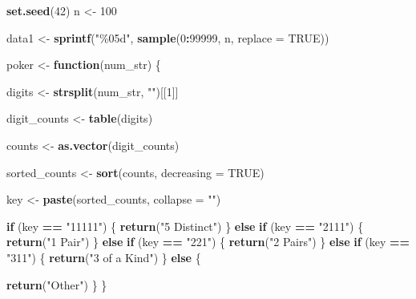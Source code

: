 \documentclass[
  persian,
]{article}
\newenvironment{Shaded}{\begin{snugshade}}{\end{snugshade}}
\newcommand{\AttributeTok}[1]{\textcolor[rgb]{0.13,0.29,0.53}{#1}}
\newcommand{\ConstantTok}[1]{\textcolor[rgb]{0.56,0.35,0.01}{#1}}
\newcommand{\ControlFlowTok}[1]{\textcolor[rgb]{0.13,0.29,0.53}{\textbf{#1}}}
\newcommand{\DecValTok}[1]{\textcolor[rgb]{0.00,0.00,0.81}{#1}}
\newcommand{\FunctionTok}[1]{\textcolor[rgb]{0.13,0.29,0.53}{\textbf{#1}}}
\newcommand{\NormalTok}[1]{#1}
\newcommand{\OtherTok}[1]{\textcolor[rgb]{0.56,0.35,0.01}{#1}}
\newcommand{\SpecialCharTok}[1]{\textcolor[rgb]{0.81,0.36,0.00}{\textbf{#1}}}
\newcommand{\StringTok}[1]{\textcolor[rgb]{0.31,0.60,0.02}{#1}}
\begin{document}
\begin{Shaded}
\begin{Highlighting}[]
\FunctionTok{set.seed}\NormalTok{(}\DecValTok{42}\NormalTok{)}
\NormalTok{n }\OtherTok{\textless{}{-}} \DecValTok{100}

\NormalTok{data1 }\OtherTok{\textless{}{-}} \FunctionTok{sprintf}\NormalTok{(}\StringTok{"\%05d"}\NormalTok{, }\FunctionTok{sample}\NormalTok{(}\DecValTok{0}\SpecialCharTok{:}\DecValTok{99999}\NormalTok{, n, }\AttributeTok{replace =} \ConstantTok{TRUE}\NormalTok{))}

\NormalTok{poker }\OtherTok{\textless{}{-}} \ControlFlowTok{function}\NormalTok{(num\_str) \{}
  
\NormalTok{  digits }\OtherTok{\textless{}{-}} \FunctionTok{strsplit}\NormalTok{(num\_str, }\StringTok{""}\NormalTok{)[[}\DecValTok{1}\NormalTok{]]}
  
\NormalTok{  digit\_counts }\OtherTok{\textless{}{-}} \FunctionTok{table}\NormalTok{(digits)}
  
\NormalTok{  counts }\OtherTok{\textless{}{-}} \FunctionTok{as.vector}\NormalTok{(digit\_counts)}
  
\NormalTok{  sorted\_counts }\OtherTok{\textless{}{-}} \FunctionTok{sort}\NormalTok{(counts, }\AttributeTok{decreasing =} \ConstantTok{TRUE}\NormalTok{)}
  
\NormalTok{  key }\OtherTok{\textless{}{-}} \FunctionTok{paste}\NormalTok{(sorted\_counts, }\AttributeTok{collapse =} \StringTok{""}\NormalTok{)}
  
  \ControlFlowTok{if}\NormalTok{ (key }\SpecialCharTok{==} \StringTok{"11111"}\NormalTok{) \{}
    \FunctionTok{return}\NormalTok{(}\StringTok{"5 Distinct"}\NormalTok{)}
\NormalTok{  \} }\ControlFlowTok{else} \ControlFlowTok{if}\NormalTok{ (key }\SpecialCharTok{==} \StringTok{"2111"}\NormalTok{) \{}
    \FunctionTok{return}\NormalTok{(}\StringTok{"1 Pair"}\NormalTok{)}
\NormalTok{  \} }\ControlFlowTok{else} \ControlFlowTok{if}\NormalTok{ (key }\SpecialCharTok{==} \StringTok{"221"}\NormalTok{) \{}
    \FunctionTok{return}\NormalTok{(}\StringTok{"2 Pairs"}\NormalTok{)}
\NormalTok{  \} }\ControlFlowTok{else} \ControlFlowTok{if}\NormalTok{ (key }\SpecialCharTok{==} \StringTok{"311"}\NormalTok{) \{}
    \FunctionTok{return}\NormalTok{(}\StringTok{"3 of a Kind"}\NormalTok{)}
\NormalTok{  \} }\ControlFlowTok{else}\NormalTok{ \{}
    
    \FunctionTok{return}\NormalTok{(}\StringTok{"Other"}\NormalTok{)}
\NormalTok{  \}}
\NormalTok{\}}


\end{Highlighting}
\end{Shaded}
\end{document}
